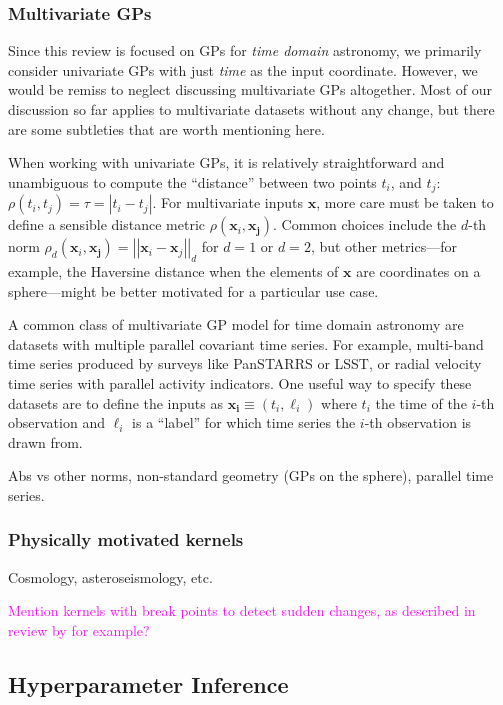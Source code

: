 \documentclass[letterpaper]{ar-1col}
\newcommand{\suz}[1]{\textcolor{magenta}{#1}}
\newcommand{\dt}{\ensuremath{\tau}}
\begin{document}
\subsubsection{Multivariate GPs}

Since this review is focused on GPs for \emph{time domain} astronomy, we primarily consider univariate GPs with just \emph{time} as the input coordinate.
However, we would be remiss to neglect discussing multivariate GPs altogether.
Most of our discussion so far applies to multivariate datasets without any change, but there are some subtleties that are worth mentioning here.

When working with univariate GPs, it is relatively straightforward and unambiguous to compute the ``distance'' between two points $t_i$, and $t_j$: $\rho(t_i,t_j) = \dt = \left|t_i - t_j\right|$.
For multivariate inputs $\boldsymbol{x}$, more care must be taken to define a sensible distance metric $\rho(\boldsymbol{x}_i,\boldsymbol{x_j})$.
Common choices include the $d$-th norm $\rho_d(\boldsymbol{x}_i,\boldsymbol{x_j}) = \left|\left|\boldsymbol{x}_i - \boldsymbol{x}_j\right|\right|_d$ for $d=1$ or $d=2$, but other metrics---for example, the Haversine distance when the elements of $\boldsymbol{x}$ are coordinates on a sphere---might be better motivated for a particular use case.

A common class of multivariate GP model for time domain astronomy are datasets with multiple parallel covariant time series.
For example, multi-band time series produced by surveys like PanSTARRS or LSST, or radial velocity time series with parallel activity indicators.
One useful way to specify these datasets are to define the inputs as $\boldsymbol{x_i} \equiv (t_i,\ell_i)$ where $t_i$ the time of the $i$-th observation and $\ell_i$ is a ``label'' for which time series the $i$-th observation is drawn from.

Abs vs other norms, non-standard geometry (GPs on the sphere), parallel time series.

\subsubsection{Physically motivated kernels}

Cosmology, asteroseismology, etc.

\suz{Mention kernels with break points to detect sudden changes, as described in review by \citet{2012RSPTA.37110550R} for example?}

\subsection{Hyperparameter Inference}
\end{document}
